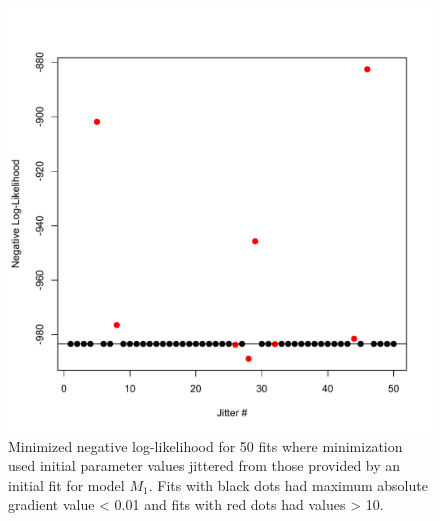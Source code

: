 \documentclass[
]{article}
\begin{document}
\begin{figure}

{\centering \includegraphics[width=1\linewidth]{fit_1_jitter_plt} 

}

\caption{Minimized negative log-likelihood for 50 fits where minimization used initial parameter values jittered from those provided by an initial fit for model $M_1$. Fits with black dots had maximum absolute gradient value < 0.01 and fits with red dots had values > 10.}\label{fig:jitter-M1}
\end{figure}
\pagebreak
\end{document}
